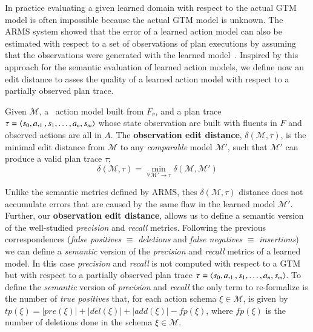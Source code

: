 In practice evaluating a given learned domain with respect to the actual GTM model is often impossible because the actual GTM model is unknown. The ARMS system showed that the error of a learned action model can also be estimated with respect to a set of observations of plan executions by assuming that the observations were generated with the learned model~\cite{yang2007learning}. Inspired by this approach for the semantic evaluation of learned action models, we define now an edit distance to asses the quality of a learned action model with respect to a partially observed plan trace. 

\begin{mydefinition}
  Given $\mathcal{M}$, a \strips\ action model built from $F_v$, and a plan trace $\tau={\langle s_0,a,_1,s_1,\ldots,a_n,s_{m} \rangle}$ whose state observation are built with fluents in $F$ and observed actions are all in $A$. The {\bf observation edit distance}, $\delta(\mathcal{M},\tau)$, is the minimal edit distance from $\mathcal{M}$ to any {\em comparable} model $\mathcal{M}'$, such that $\mathcal{M}'$ can produce a valid plan trace $\tau$; \[\delta(\mathcal{M},\tau)=\min_{\forall \mathcal{M}' \rightarrow \tau} \delta(\mathcal{M},\mathcal{M}')\]
\end{mydefinition}

Unlike the semantic metrics defined by ARMS, thes $\delta(\mathcal{M},\tau)$ distance does not accumulate errors that are caused by the same flaw in the learned model $\mathcal{M}'$. Further, our {\bf observation edit distance}, allows us to define a semantic version of the well-studied {\em precision} and {\em recall} metrics. Following the previous correspondences ({\em false positives} $\equiv$ {\em deletions} and {\em false negatives} $\equiv$ {\em insertions}) we can define a {\em semantic} version of the {\em precision} and {\em recall} metrics of a learned model. In this case {\em precision} and {\em recall} is not computed with respect to a GTM but with respect to a partially observed plan trace $\tau={\langle s_0,a,_1,s_1,\ldots,a_n,s_m \rangle}$. To define the {\em semantic} version of {\em precision} and {\em recall} the only term to re-formalize is the number of {\em true positives} that, for each action schema $\xi\in\mathcal{M}$, is given by $tp(\xi)=|pre(\xi)|+|del(\xi)|+|add(\xi)|-fp(\xi)$, where $fp(\xi)$ is the number of deletions done in the schema $\xi\in\mathcal{M}$.



